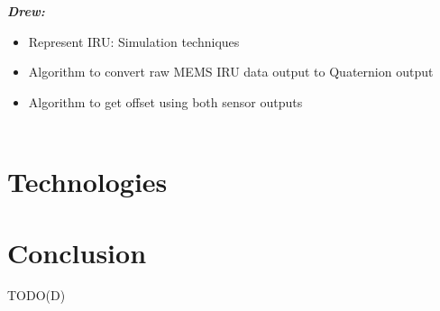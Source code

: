 \documentclass[letterpaper,10pt,onecolumn]{IEEEtran}
\begin{document}
\textit{\textbf{Drew:}}
\begin{itemize}
	\item Represent IRU: Simulation techniques
	\item Algorithm to convert raw MEMS IRU data output to Quaternion output
	\item Algorithm to get offset using both sensor outputs\\\\
\end{itemize}



\section{Technologies}
	
	
	

\section{Conclusion}
TODO(D)


\newpage
\nocite{*}


\end{document}
